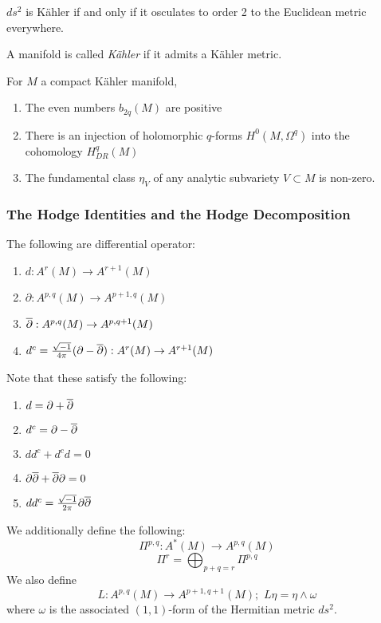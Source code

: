 \begin{lem}

$ds^2$ is K\"ahler if and only if it osculates to order 2 to the Euclidean metric everywhere.

\end{lem}

\begin{defn}

A manifold is called \textit{K\"ahler} if it admits a K\"ahler metric.

\end{defn}

\begin{prop}
For $M$ a compact K\"ahler manifold,
\begin{enumerate}
	\item The even numbers $b_{ 2q }(M)$ are positive
	\item There is an injection of holomorphic $q$-forms $H^0 \left( M, \Omega^q \right)$ into the cohomology $ H^q_{ DR } (M)$
	\item The fundamental class $ \eta_V$ of any analytic subvariety $V \subset M$ is non-zero.
\end{enumerate}

\end{prop}

\subsubsection{The Hodge Identities and the Hodge Decomposition}

\begin{defn}
The following are differential operator:
\begin{enumerate}
	\item $d: A^r (M) \to A^{r+1}(M)$
	\item $ \partial: A^{p,q}(M) \to A^{p+1,q}(M)$
	\item $ \overline{\partial}: A^{p,q}(M) \to A^{p,q+1}(M)$
	\item $ d^c = \frac{ \sqrt{-1}}{4 \pi} ( \partial - \overline{\partial}): A^r(M) \to A^{r+1}(M)$
\end{enumerate}
Note that these satisfy the following:
\begin{enumerate}
	\item $d = \partial + \overline{\partial}$
	\item $d^c = \partial - \overline{\partial}$
	\item $ d d^c + d^c d = 0$
	\item $ \partial \overline{\partial} + \overline{\partial} \partial = 0$
	\item $ d d^c = \frac{ \sqrt{-1}}{2 \pi} \partial \overline{\partial}$
\end{enumerate}
We additionally define the following:
\[
	\Pi^{p,q}: A^*(M) \to A^{p,q}(M)
\]
\[
\Pi^r = \bigoplus_{p+q=r} \Pi^{p,q}
\]
We also define
\[
	L: A^{p,q}(M) \to A^{p+1,q+1}(M); \hspace{4pt} L \eta = \eta \wedge \omega
\]
where $ \omega$ is the associated $(1,1)$-form of the Hermitian metric $ds^2$.
\end{defn}

